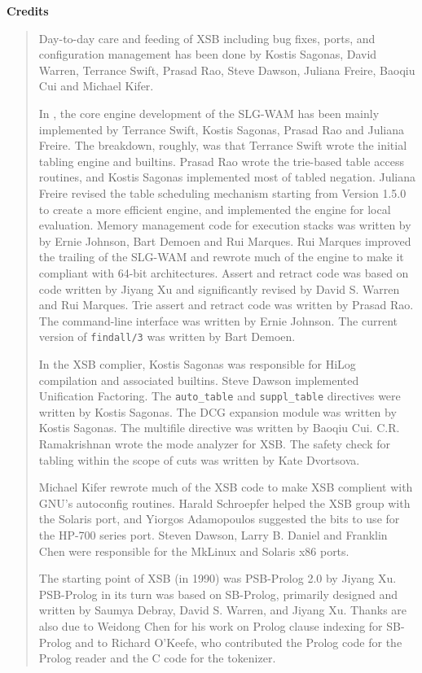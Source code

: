 
\begin{center}
{\bf {\Large 
		Credits
}}
\end{center}


\begin{quote}
Day-to-day care and feeding of XSB including bug fixes, ports, and
configuration management has been done by Kostis Sagonas, David
Warren, Terrance Swift, Prasad Rao, Steve Dawson, Juliana Freire, 
Baoqiu Cui and Michael Kifer.

In \version, the core engine development of the SLG-WAM has
been mainly implemented by Terrance Swift, Kostis Sagonas, Prasad Rao
and Juliana Freire.  The breakdown, roughly, was that Terrance Swift
wrote the initial tabling engine and builtins.  Prasad Rao wrote the
trie-based table access routines, and Kostis Sagonas implemented most
of tabled negation.  Juliana Freire revised the table scheduling
mechanism starting from Version 1.5.0 to create a more efficient
engine, and implemented the engine for local evaluation.  Memory
management code for execution stacks was written by by Ernie Johnson,
Bart Demoen and Rui Marques.  Rui Marques improved the trailing of the
SLG-WAM and rewrote much of the engine to make it compliant with
64-bit architectures.  Assert and retract code was based on code
written by Jiyang Xu and significantly revised by David S. Warren and
Rui Marques.  Trie assert and retract code was written by Prasad Rao.
The command-line interface was written by Ernie Johnson.  The current
version of {\tt findall/3} was written by Bart Demoen.

In the XSB complier, Kostis Sagonas was responsible for HiLog
compilation and associated builtins.  Steve Dawson implemented
Unification Factoring.  The {\tt auto\_table} and {\tt suppl\_table}
directives were written by Kostis Sagonas.  The DCG expansion module
was written by Kostis Sagonas.  The multifile directive was written by
Baoqiu Cui.  C.R. Ramakrishnan wrote the mode analyzer for XSB.  The
safety check for tabling within the scope of cuts was written by Kate
Dvortsova.

Michael Kifer rewrote much of the XSB code to make XSB complient with
GNU's autoconfig routines.  Harald Schroepfer helped the XSB group
with the Solaris port, and Yiorgos Adamopoulos suggested the bits to
use for the HP-700 series port.  Steven Dawson, Larry B. Daniel and
Franklin Chen were responsible for the MkLinux and Solaris x86 ports.

The starting point of XSB (in 1990) was PSB-Prolog 2.0 by Jiyang Xu.
PSB-Prolog in its turn was based on SB-Prolog, primarily designed and
written by Saumya Debray, David S. Warren, and Jiyang Xu.  Thanks are
also due to Weidong Chen for his work on Prolog clause indexing for
SB-Prolog and to Richard O'Keefe, who contributed the Prolog code for
the Prolog reader and the C code for the tokenizer.  

\end{quote}
